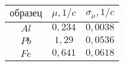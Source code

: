 \begin{tabular}{| c | c | c |}
\hline
$образец$ & $\mu , 1/c$ & $\sigma_{\mu}, 1/c$\\
\hline
$Al$ & $0,234$ & $0,0038$\\
\hline
$Pb$ & $1,29$ & $0,0536$\\
\hline
$Fe$ & $0,641$ & $0,0618$\\
\hline
\end{tabular}

